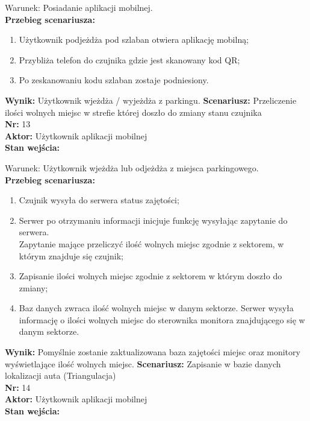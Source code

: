 \documentclass[12pt,a4paper]{article}
\begin{document}
Warunek: Posiadanie aplikacji mobilnej.
\\{\bf Przebieg scenariusza:}
\begin{enumerate}
\item Użytkownik podjeżdża pod szlaban otwiera aplikację mobilną;
\item Przybliża telefon do czujnika gdzie jest skanowany kod QR;
\item Po zeskanowaniu kodu szlaban zostaje podniesiony.
\end{enumerate}
{\bf Wynik:} Użytkownik wjeżdża / wyjeżdża z parkingu.
\newline\newline
{\large \bf Scenariusz:} Przeliczenie ilości wolnych miejsc w strefie której doszło do zmiany stanu czujnika
\\{\bf Nr:} 13
\\{\bf Aktor:} Użytkownik aplikacji mobilnej
\\{\bf Stan wejścia:}

Warunek: Użytkownik wjeżdża lub odjeżdża z miejsca parkingowego.
\\{\bf Przebieg scenariusza:}
\begin{enumerate}
\item Czujnik wysyła do serwera status zajętości;
\item Serwer po otrzymaniu informacji inicjuje funkcję wysyłając zapytanie do serwera.\\Zapytanie mające przeliczyć ilość wolnych miejsc zgodnie z sektorem, w którym znajduje się czujnik;
\item Zapisanie ilości wolnych miejsc zgodnie z sektorem w którym doszło do zmiany;
\item Baz danych zwraca ilość wolnych miejsc w danym sektorze. Serwer wysyła informację o ilości wolnych miejsc do sterownika monitora znajdującego się w danym sektorze.
\end{enumerate}
{\bf Wynik:} Pomyślnie zostanie zaktualizowana baza zajętości miejsc oraz monitory\\wyświetlające ilość wolnych miejsc.
\newline\newline\newline\newline\newline\newline\newline\newline\newline\newline\newline\newline\newline\newline
{\large \bf Scenariusz:} Zapisanie w bazie danych lokalizacji auta (Triangulacja)
\\{\bf Nr:} 14
\\{\bf Aktor:} Użytkownik aplikacji mobilnej
\\{\bf Stan wejścia:}
\end{document}
